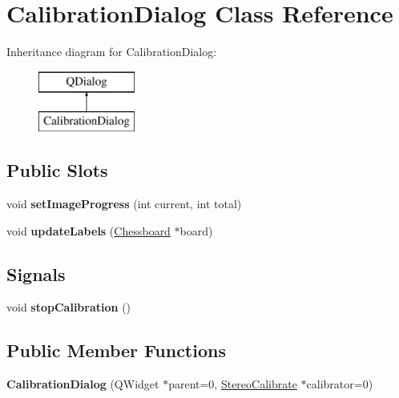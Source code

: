 \hypertarget{class_calibration_dialog}{}\section{Calibration\+Dialog Class Reference}
\label{class_calibration_dialog}
Inheritance diagram for Calibration\+Dialog\+:\begin{figure}[H]
\begin{center}
\leavevmode
\includegraphics[height=2.000000cm]{class_calibration_dialog}
\end{center}
\end{figure}
\subsection*{Public Slots}
\begin{DoxyCompactItemize}
\item 
\hypertarget{class_calibration_dialog_aa93f4f8df0d73fe6a9c005ee0fe6bb24}{}void {\bfseries set\+Image\+Progress} (int current, int total)\label{class_calibration_dialog_aa93f4f8df0d73fe6a9c005ee0fe6bb24}

\item 
\hypertarget{class_calibration_dialog_a7325731e673238cdaa9c8292fc8188e9}{}void {\bfseries update\+Labels} (\hyperlink{class_chessboard}{Chessboard} $\ast$board)\label{class_calibration_dialog_a7325731e673238cdaa9c8292fc8188e9}

\end{DoxyCompactItemize}
\subsection*{Signals}
\begin{DoxyCompactItemize}
\item 
\hypertarget{class_calibration_dialog_a0dbbfdbd304e257105e807fc40d494cf}{}void {\bfseries stop\+Calibration} ()\label{class_calibration_dialog_a0dbbfdbd304e257105e807fc40d494cf}

\end{DoxyCompactItemize}
\subsection*{Public Member Functions}
\begin{DoxyCompactItemize}
\item 
\hypertarget{class_calibration_dialog_aacf17330c3788d302c7e83fd2e9dbef6}{}{\bfseries Calibration\+Dialog} (Q\+Widget $\ast$parent=0, \hyperlink{class_stereo_calibrate}{Stereo\+Calibrate} $\ast$calibrator=0)\label{class_calibration_dialog_aacf17330c3788d302c7e83fd2e9dbef6}

\end{DoxyCompactItemize}


